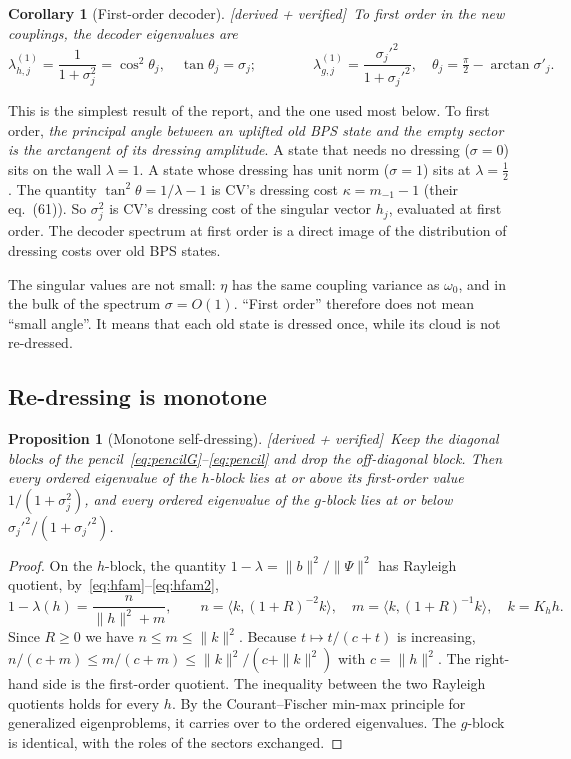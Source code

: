 \documentclass[11pt]{article}
\newcommand{\ip}[2]{\langle #1,#2\rangle}
\newcommand{\Kh}{K_h}
\newcommand{\tagbox}[2]{\textsf{\small\color{#1}[#2]}}
\newcommand{\VER}{\tagbox{cder}{derived + verified}}
\theoremstyle{plain}
\newtheorem{proposition}{Proposition}
\newtheorem{corollary}{Corollary}
\theoremstyle{remark}
\numberwithin{equation}{section}
\begin{document}
\begin{corollary}[First-order decoder]\label{cor:first}\VER\
To first order in the new couplings, the decoder eigenvalues are
\begin{equation}\label{eq:first}
\lambda^{(1)}_{h,j}=\frac{1}{1+\sigma_j^2}=\cos^2\theta_j,\quad \tan\theta_j=\sigma_j;\qquad\qquad
\lambda^{(1)}_{g,j}=\frac{\sigma_j'^2}{1+\sigma_j'^2},\quad \theta_j=\tfrac\pi2-\arctan\sigma'_j .
\end{equation}
\end{corollary}

This is the simplest result of the report, and the one used most below. To first order, \emph{the principal angle between an
uplifted old BPS state and the empty sector is the arctangent of its dressing amplitude}. A state that needs no
dressing ($\sigma=0$) sits on the wall $\lambda=1$. A state whose dressing has unit norm ($\sigma=1$) sits at
$\lambda=\tfrac12$. The quantity $\tan^2\theta=1/\lambda-1$ is CV's dressing cost $\kappa=m_{-1}-1$ (their eq.~(61)). So
$\sigma_j^2$ is CV's dressing cost of the singular vector $h_j$, evaluated at first order. The decoder spectrum at first order
is a direct image of the distribution of dressing costs over old BPS states.

The singular values are not small: $\eta$ has the same coupling variance as $\omega_0$, and in the bulk of the spectrum
$\sigma=O(1)$. ``First order'' therefore does not mean ``small angle''. It means that each old state is dressed once, while
its cloud is not re-dressed.

\subsection{Re-dressing is monotone}

\begin{proposition}[Monotone self-dressing]\label{prop:monotone}\VER\
Keep the diagonal blocks of the pencil~\eqref{eq:pencilG}--\eqref{eq:pencil} and drop the off-diagonal block. Then every ordered eigenvalue of the
$h$-block lies at or above its first-order value $1/(1+\sigma_j^2)$, and every ordered eigenvalue of the $g$-block lies
at or below $\sigma_j'^2/(1+\sigma_j'^2)$.
\end{proposition}

\begin{proof}
On the $h$-block, the quantity $1-\lambda=\|b\|^2/\|\Psi\|^2$ has Rayleigh quotient, by~\eqref{eq:hfam}--\eqref{eq:hfam2},
\[
1-\lambda(h)=\frac{n}{\|h\|^2+m},\qquad n=\ip{k}{(1+R)^{-2}k},\quad m=\ip{k}{(1+R)^{-1}k},\quad k=\Kh h .
\]
Since $R\ge0$ we have $n\le m\le\|k\|^2$. Because $t\mapsto t/(c+t)$ is increasing, $n/(c+m)\le m/(c+m)\le\|k\|^2/(c+\|k\|^2)$ with
$c=\|h\|^2$. The right-hand side is the first-order quotient. The inequality between the two Rayleigh quotients holds
for every $h$. By the Courant--Fischer min-max principle for generalized eigenproblems, it carries over to the ordered
eigenvalues. The $g$-block is identical, with the roles of the sectors exchanged.
\end{proof}
\end{document}
